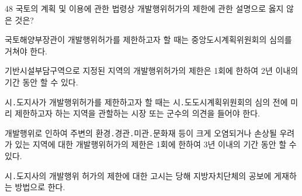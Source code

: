 \begin{question}{48}
국토의 계획 및 이용에 관한 법령상 개발행위허가의 제한에 관한 설명으로 옳지 않은 것은?
\begin{choices}
  \item 국토해양부장관이 개발행위허가를 제한하고자 할 때는 중앙도시계획위원회의 심의를 거쳐야 한다.
  \item 기반시설부담구역으로 지정된 지역의 개발행위허가의 제한은 1회에 한하여 2년 이내의 기간 동안 할 수 있다.
  \item 시․도지사가 개발행위허가를 제한하고자 할 때는 시․도도시계획위원회의 심의 전에 미리 제한하고자 하는 지역을 관할하는 시장 또는 군수의 의견을 들어야 한다.
  \item 개발행위로 인하여 주변의 환경․경관․미관․문화재 등이 크게 오염되거나 손상될 우려가 있는 지역에 대한 개발행위허가의 제한은 1회에 한하여 3년 이내의 기간 동안 할 수 있다.
  \item 시․도지사의 개발행위 허가의 제한에 대한 고시는 당해 지방자치단체의 공보에 게재하는 방법으로 한다.
\end{choices}
\end{question}
